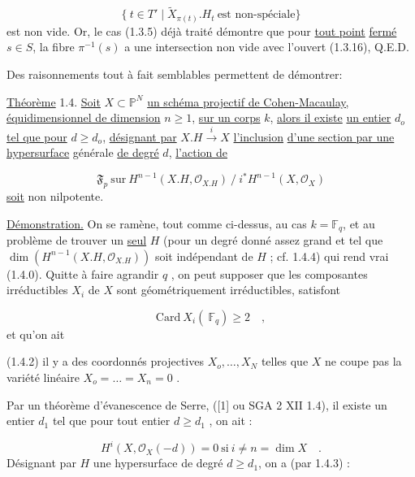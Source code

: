 \begin{equation}\tag{1.3.16}
\{\ t \in T' \mid \widetilde{X}_{\pi(t)}.H_t \ \mbox{est non-spéciale}\}
\end{equation}
est non vide. Or, le cas (1.3.5) déjà traité démontre que pour \underline{tout point}
\underline{fermé} $s \in S$, la fibre $\pi^{-1}(s)$ a une intersection non vide avec l'ouvert (1.3.16), Q.E.D.

Des raisonnements tout à fait semblables permettent de démontrer:

\underline{Théorème} 1.4. \underline{Soit} $X \subset \mathbb{P}^N$ \underline{un schéma projectif de Cohen-Macaulay,} \underline{équidimensionnel de dimension} $n \geq 1$, \underline{sur un corps} $k$, \underline{alors il existe} \underline{un entier} $d_o$ \underline{tel que pour} $d \geq d_o$, \underline{désignant par} $X.H \stackrel{i}{\longrightarrow} X$ \underline{l'inclusion} \underline{d'une section par une hypersurface} générale \underline{de degré} $d$, \underline{l'action de}

\begin{equation}\tag{1.4.0}
\mathfrak{F}_p \ \mathrm{sur}\ H^{n-1}(X.H,\mathcal{O}_{X.H}) \ /\ i^{*}H^{n-1}(X,\mathcal{O}_X)
\end{equation}
\underline{soit} non nilpotente.

\underline{Démonstration.} On se ramène, tout comme ci-dessus, au cas $k = \mathbb{F}_q$, et au problème de trouver un \underline{seul} $H$ (pour un degré donné assez grand et tel que $\dim(H^{n-1}(X.H,\mathcal{O}_{X.H}))$ soit indépendant de $H$ ; cf. 1.4.4) qui rend vrai (1.4.0). Quitte à faire agrandir $q$ , on peut supposer que les composantes irréductibles $X_i$ de $X$ sont géométriquement irréductibles, satisfont

\begin{equation}\tag{1.4.1}
\mathrm{Card}\ X_i(\ \mathbb{F}_q) \geq 2 \quad ,
\end{equation}
et qu'on ait

(1.4.2) il y a des coordonnés projectives $X_o,\ldots,X_N$ telles que $X$ ne coupe pas la variété linéaire $X_o = \ldots = X_n = 0$ .

Par un théorème d'évanescence de Serre, ([1] ou SGA 2 XII 1.4), il existe un entier $d_1$ tel que pour tout entier $d \geq d_1$ , on ait :



\begin{equation}\tag{1.4.3}
H^i(X,\mathcal{O}_X(-d)) = 0 \ \mathrm{si}\ i \neq n = \dim X \quad .
\end{equation}
Désignant par $H$ une hypersurface de degré $d \geq d_1$, on a (par 1.4.3) :

